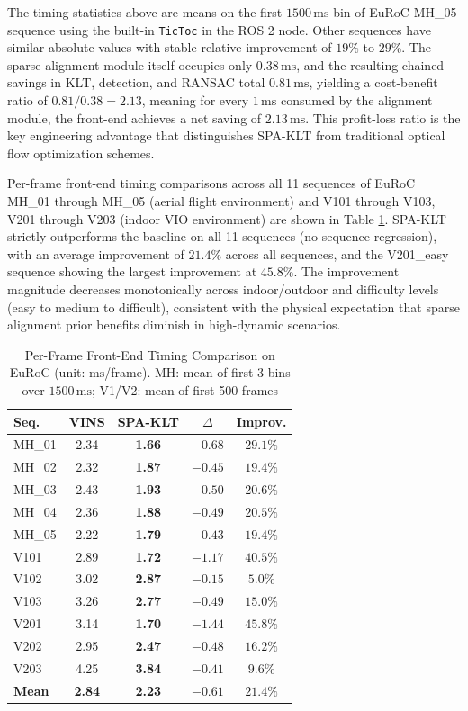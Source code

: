 \documentclass[journal,twoside,web]{ieeecolor}
\begin{document}
The timing statistics above are means on the first $1500\,\mathrm{ms}$ bin of EuRoC MH\_05 sequence using the built-in \texttt{TicToc} in the ROS 2 node. Other sequences have similar absolute values with stable relative improvement of $19\%$ to $29\%$. The sparse alignment module itself occupies only $0.38\,\mathrm{ms}$, and the resulting chained savings in KLT, detection, and RANSAC total $0.81\,\mathrm{ms}$, yielding a cost-benefit ratio of $0.81/0.38 = 2.13$, meaning for every $1\,\mathrm{ms}$ consumed by the alignment module, the front-end achieves a net saving of $2.13\,\mathrm{ms}$. This profit-loss ratio is the key engineering advantage that distinguishes SPA-KLT from traditional optical flow optimization schemes.

Per-frame front-end timing comparisons across all 11 sequences of EuRoC MH\_01 through MH\_05 (aerial flight environment) and V101 through V103, V201 through V203 (indoor VIO environment) are shown in Table \ref{tab:timing_seq}. SPA-KLT strictly outperforms the baseline on all 11 sequences (no sequence regression), with an average improvement of $21.4\%$ across all sequences, and the V201\_easy sequence showing the largest improvement at $45.8\%$. The improvement magnitude decreases monotonically across indoor/outdoor and difficulty levels (easy to medium to difficult), consistent with the physical expectation that sparse alignment prior benefits diminish in high-dynamic scenarios.

\begin{table}[!t]
\centering
\caption{Per-Frame Front-End Timing Comparison on EuRoC (unit: $\mathrm{ms}$/frame). MH: mean of first 3 bins over $1500\,\mathrm{ms}$; V1/V2: mean of first 500 frames}
\label{tab:timing_seq}
\begin{tabular}{|l|c|c|c|c|}
\hline
Seq. & VINS & SPA-KLT & $\Delta$ & Improv. \\
\hline
MH\_01 & 2.34 & \textbf{1.66} & $-0.68$ & $\mathbf{29.1\%}$ \\
\hline
MH\_02 & 2.32 & \textbf{1.87} & $-0.45$ & $19.4\%$ \\
\hline
MH\_03 & 2.43 & \textbf{1.93} & $-0.50$ & $20.6\%$ \\
\hline
MH\_04 & 2.36 & \textbf{1.88} & $-0.49$ & $20.5\%$ \\
\hline
MH\_05 & 2.22 & \textbf{1.79} & $-0.43$ & $19.4\%$ \\
\hline
V101 & 2.89 & \textbf{1.72} & $-1.17$ & $\mathbf{40.5\%}$ \\
\hline
V102 & 3.02 & \textbf{2.87} & $-0.15$ & $5.0\%$ \\
\hline
V103 & 3.26 & \textbf{2.77} & $-0.49$ & $15.0\%$ \\
\hline
V201 & 3.14 & \textbf{1.70} & $-1.44$ & $\mathbf{45.8\%}$ \\
\hline
V202 & 2.95 & \textbf{2.47} & $-0.48$ & $16.2\%$ \\
\hline
V203 & 4.25 & \textbf{3.84} & $-0.41$ & $9.6\%$ \\
\hline
\textbf{Mean} & \textbf{2.84} & \textbf{2.23} & $-0.61$ & $\mathbf{21.4\%}$ \\
\hline
\end{tabular}
\end{table}
\end{document}
